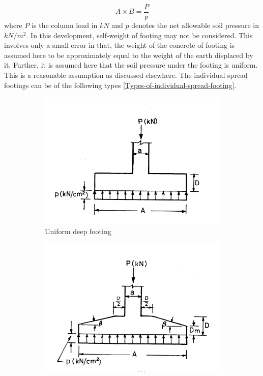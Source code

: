 \begin{equation}
\label{eq:footingArea}
A \times B = \frac{P}{p}
\end{equation}
where $P$ is the column load in $kN$ and $p$ denotes the net allowable soil
pressure in $kN/m^2$. In this development, self-weight of footing may not
be considered. This involves only a small error in that, the weight of the
concrete of footing is assumed here to be approximately equal to the weight
of the earth displaced by it. Further, it is assumed here that the soil
pressure under the footing is uniform. This is a reasonable assumption as
discussed elsewhere. The individual spread footings can be of the following
types \figmacro \ref{Types-of-individual-spread-footing}.

\begin{figure}
  \begin{subfigure}[b]{0.5\textwidth}
    \includegraphics[width=\textwidth]{images/fig2291.png}
    \caption{Uniform deep footing}
    \label{uniformdeepfooting}
  \end{subfigure}
  \begin{subfigure}[b]{0.5\textwidth}
    \includegraphics[width=\textwidth]{images/fig2292.png}

\end{subfigure}
\end{figure}
